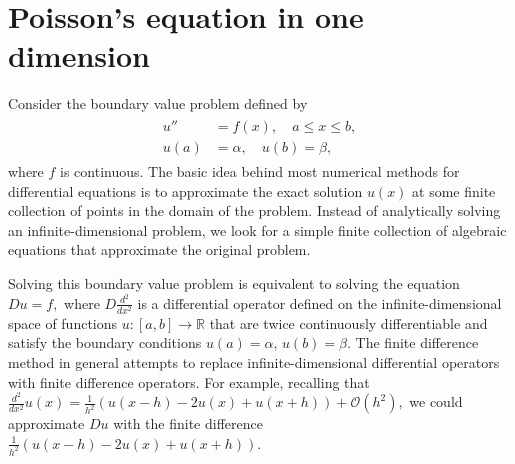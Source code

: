 \section{Poisson's equation in one dimension}
Consider the boundary value problem defined by
\begin{align}
	\begin{split}
u'' &= f(x), \quad a \leq x \leq b,\\
	u(a) &= \alpha,\quad u(b) = \beta,
	\end{split}
\end{align}
where $f$ is continuous. 
The basic idea behind most numerical methods for differential equations is to 
approximate the exact solution $u(x)$ at some finite collection of points in the 
domain of the problem. Instead of analytically solving an infinite-dimensional
problem, we look for a simple finite collection of algebraic equations that approximate the original problem.

Solving this boundary
value problem is equivalent to solving the equation $Du = f,$
where $D\frac{d^2}{dx^2}$ is a differential operator defined on the infinite-dimensional space 
of functions $u:[a,b] \to \mathbb{R}$ that are twice continuously differentiable and 
satisfy the boundary conditions $u(a) = \alpha$, $u(b) = \beta$. The finite difference method in general attempts to replace infinite-dimensional differential operators with finite difference operators. For example, recalling that $\frac{d^2}{dx^2}u(x) = \frac{1}{h^2}\left(u(x-h) -2u(x) + u(x+h)\right) + \mathcal{O}(h^2),$ we could  approximate $Du$ with the finite difference $\frac{1}{h^2}\left(u(x-h) -2u(x) + u(x+h)\right).$


